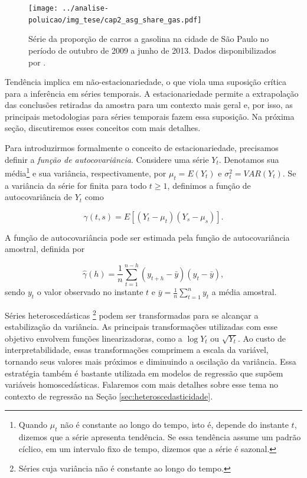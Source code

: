 \begin{figure}[h!]
	\centering
	\texttt{[image: ../analise-poluicao/img\_tese/cap2\_asg\_share\_gas.pdf]}
	\caption{Série da proporção de carros a gasolina na cidade de São Paulo no período de outubro de 2009 a junho de 2013. Dados disponibilizados por \cite{Salvo2017}.}
	\label{fig:cap2_asg_share_gas}
\end{figure}

Tendência implica em não-estacionariedade, o que viola uma suposição crítica para a inferência em séries temporais. A estacionariedade permite a extrapolação das conclusões retiradas da amostra para um contexto mais geral e, por isso, as principais metodologias para séries temporais fazem essa suposição. Na próxima seção, discutiremos esses conceitos com mais detalhes. 


Para introduzirmos formalmente o conceito de estacionariedade, precisamos definir a \textit{função de autocovariância}. Considere uma série $Y_t$. Denotamos sua média\footnote{Quando $\mu_t$ não é constante ao longo do tempo, isto é, depende do instante $t$, dizemos que a série apresenta tendência. Se essa tendência assume um padrão cíclico, em um intervalo fixo de tempo, dizemos que a série é sazonal.} e sua variância, respectivamente, por $\mu_t = E(Y_t)$ e $\sigma^2_t = VAR(Y_t)$. Se a variância da série for finita para todo $t \geq 1$, definimos a função de autocovariância de $Y_t$ como

\begin{displaymath}
\gamma(t,s) = E\left[(Y_t - \mu_t)(Y_s - \mu_s)\right].
\end{displaymath}

A função de autocovariância pode ser estimada pela função de autocovariância amostral, definida por

\begin{equation}
\hat{\gamma}(h) = \frac{1}{n}\sum_{t=1}^{n-h}(y_{t+h} - \bar{y})(y_t - \bar{y}),
\label{def:sample-autocov}
\end{equation}
sendo $y_t$ o valor observado no instante $t$ e $\bar{y} = \frac{1}{n}\sum_{t=1}^{n}y_t$ a média amostral.

Séries heteroscedásticas \footnote{Séries cuja variância não é constante ao longo do tempo.} podem ser transformadas para se alcançar a estabilização da variância. As principais transformações utilizadas com esse objetivo envolvem funções linearizadoras, como a $\log{Y_t}$ ou $\sqrt{Y_t}$. Ao custo de interpretabilidade, essas transformações comprimem a escala da variável, tornando seus valores mais próximos e diminuindo a oscilação da variância. Essa estratégia também é bastante utilizada em modelos de regressão que supõem variáveis homoscedásticas. Falaremos com mais detalhes sobre esse tema no contexto de regressão na Seção \ref{sec:heteroscedasticidade}.

